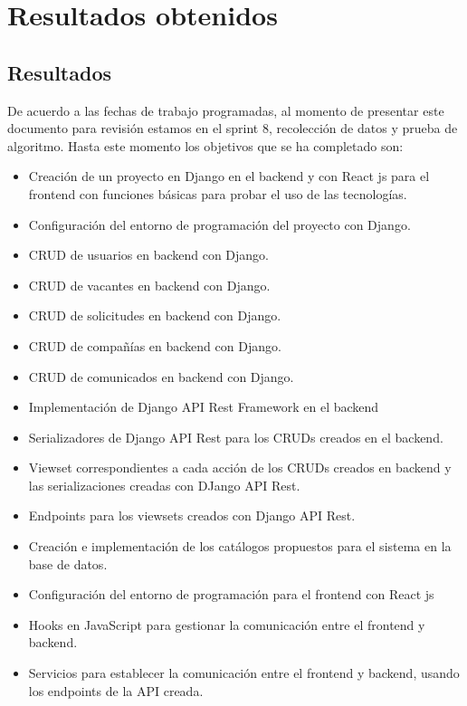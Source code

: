 \clearpage
\chapter{Resultados obtenidos}

 \section{Resultados}


De acuerdo a las fechas de trabajo programadas, al momento de presentar este documento para revisión estamos en el sprint 8, recolección de datos y prueba de algoritmo. Hasta este momento los objetivos que se ha completado son:

\begin{itemize}
	\item Creación de un proyecto en Django en el backend y con React js para el frontend con funciones básicas para probar el uso de las tecnologías.
	\item Configuración del entorno de programación del proyecto con Django.
	\item CRUD de usuarios en backend con Django.
	\item CRUD de vacantes en backend con Django.
	\item CRUD de solicitudes en backend con Django.
	\item CRUD de compañías en backend con Django.
	\item CRUD de comunicados en backend con Django.
	\item Implementación de Django API Rest Framework en el backend
	\item Serializadores de Django API Rest para los CRUDs creados en el backend.
	\item Viewset correspondientes a cada acción de los CRUDs creados en backend y las serializaciones creadas con DJango API Rest.
	\item Endpoints para los viewsets creados con Django API Rest.
	\item Creación e implementación de los catálogos propuestos para el sistema en la base de datos.
	\item Configuración del entorno de programación para el frontend con React js
	\item Hooks en JavaScript para gestionar la comunicación entre el frontend y backend.
	\item Servicios para establecer la comunicación entre el frontend y backend, usando los endpoints de la API creada.

\end{itemize}
